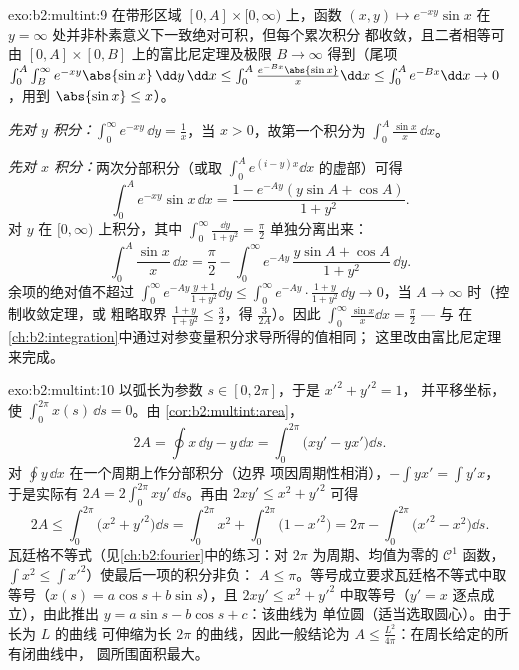 \begin{solution}{exo:b2:multint:9}
在带形区域 $[0, A] \times [0, \infty)$ 上，函数 $(x, y)
\mapsto e^{-xy}\sin x$ 在 $y =
\infty$ 处并非朴素意义下一致绝对可积，但每个累次积分
都收敛，且二者相等可由 $[0, A]
\times [0, B]$ 上的富比尼定理及极限 $B \to \infty$ 得到（尾项
$\int_0^A\int_B^\infty e^{-xy}\abs{\sin x}\,\dd y\,\dd x \leq
\int_0^A \frac{e^{-Bx}\abs{\sin x}}{x}\dd x \leq \int_0^A e^{-Bx}
\dd x\to 0$，用到 $\abs{\sin x} \leq x$）。

\emph{先对 $y$ 积分：}$\int_0^\infty e^{-xy}\,\dd y = \frac1x$，当 $x
> 0$，故第一个积分为 $\int_0^A \frac{\sin x}{x}\,\dd x$。

\emph{先对 $x$ 积分：}两次分部积分（或取
$\int_0^A e^{(i - y)x}\dd x$ 的虚部）可得
\[
\int_0^A e^{-xy}\sin x\,\dd x
= \frac{1 - e^{-Ay}(y\sin A + \cos A)}{1 + y^2} .
\]
对 $y$ 在 $[0, \infty)$ 上积分，其中 $\int_0^\infty
\frac{\dd y}{1 + y^2} = \frac\pi2$ 单独分离出来：
\[
\int_0^A \frac{\sin x}{x}\,\dd x
= \frac{\pi}{2}
- \int_0^\infty e^{-Ay}\,\frac{y\sin A + \cos A}{1 + y^2}\,\dd y .
\]
余项的绝对值不超过 $\int_0^\infty e^{-Ay}\frac{y +
1}{1 + y^2}\dd y \leq \int_0^\infty e^{-Ay}\cdot\frac{1+y}{1+y^2}
\,\dd y \to 0$，当 $A \to \infty$ 时（控制收敛定理，或
粗略取界 $\frac{1 + y}{1 + y^2} \leq \frac32$，得
$\frac{3}{2A}$）。因此 $\int_0^\infty\frac{\sin x}{x}\dd x =
\frac\pi2$ --- 与
在\cref{ch:b2:integration}中通过对参变量积分求导所得的值相同；
这里改由富比尼定理来完成。
\end{solution}

\begin{solution}{exo:b2:multint:10}
以弧长为参数 $s \in [0, 2\pi]$，于是 $x'^2 + y'^2 = 1$，
并平移坐标，使 $\int_0^{2\pi} x(s)\,\dd s = 0$。由
\cref{cor:b2:multint:area}，
\[
2A = \oint x\,\dd y - y\,\dd x
= \int_0^{2\pi}\bigl(xy' - yx'\bigr)\dd s .
\]
对 $\oint y\,\dd x$ 在一个周期上作分部积分（边界
项因周期性相消），$-\int yx' = \int y'x$，于是实际有
$2A = 2\int_0^{2\pi}xy'\,\dd s$。再由 $2xy' \leq x^2 + y'^2$
可得
\[
2A \leq \int_0^{2\pi}\bigl(x^2 + y'^2\bigr)\dd s
= \int_0^{2\pi} x^2 + \int_0^{2\pi}\bigl(1 - x'^2\bigr)
= 2\pi - \int_0^{2\pi}\bigl(x'^2 - x^2\bigr)\dd s .
\]
瓦廷格不等式（见\cref{ch:b2:fourier}中的练习：对
$2\pi$ 为周期、均值为零的 $\mathcal{C}^1$ 函数，
$\int x^2 \leq \int x'^2$）使最后一项的积分非负：
$A \leq \pi$。等号成立要求瓦廷格不等式中取等号（$x(s) =
a\cos s + b\sin s$），且 $2xy' \leq x^2 + y'^2$ 中取等号（$y' = x$
逐点成立），由此推出 $y = a\sin s - b\cos s + c$：该曲线为
单位圆（适当选取圆心）。由于长为 $L$ 的曲线
可伸缩为长 $2\pi$ 的曲线，因此一般结论为 $A \leq
\frac{L^2}{4\pi}$：在周长给定的所有闭曲线中，
圆所围面积最大。
\end{solution}

